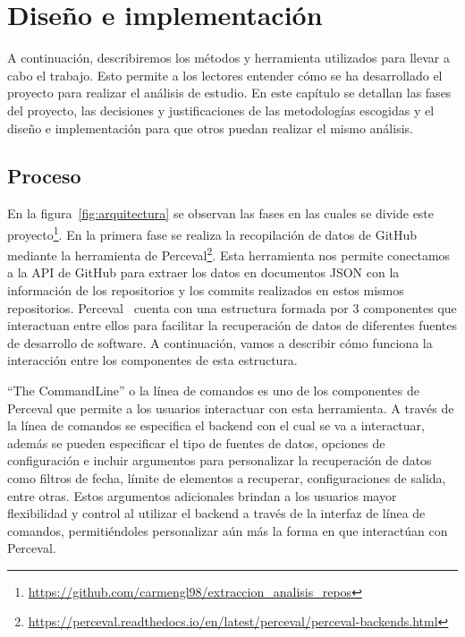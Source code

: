 \documentclass[a4paper, 12pt]{book}
\begin{document}

\cleardoublepage
\chapter{Diseño e implementación}
\label{chap:diseño}

A continuación, describiremos los métodos y herramienta utilizados para llevar a cabo el trabajo. 
Esto permite a los lectores entender cómo se ha desarrollado el proyecto para realizar el análisis de estudio.
En este capítulo se detallan las fases del proyecto, las decisiones y justificaciones de las metodologías escogidas y el diseño e implementación para que otros puedan realizar el mismo análisis.

\section{Proceso} 
\label{sec:proceso}

En la figura~\ref{fig:arquitectura} se observan las fases en las cuales se divide este proyecto\footnote{\url{https://github.com/carmengl98/extraccion_analisis_repos}}. 
En la primera fase se realiza la recopilación de datos de GitHub mediante la herramienta de Perceval\footnote{\url{https://perceval.readthedocs.io/en/latest/perceval/perceval-backends.html}}. 
Esta herramienta nos permite conectamos a la API de GitHub para extraer los datos en documentos JSON con la información de los repositorios y los commits realizados en estos mismos repositorios.
Perceval~\cite{duenas2018perceval} cuenta con una estructura formada por 3 componentes que interactuan entre ellos para facilitar la recuperación de datos de diferentes fuentes de desarrollo de software.
A continuación, vamos a describir cómo funciona la interacción entre los componentes de esta estructura.


``The CommandLine'' o la línea de comandos es uno de los componentes de Perceval que permite a los usuarios interactuar con esta herramienta.
A través de la línea de comandos se especifica el backend con el cual se va a interactuar, además se pueden especificar el tipo de fuentes de datos, opciones de configuración e incluir argumentos para personalizar la recuperación de datos como filtros de fecha, límite de elementos a recuperar, configuraciones de salida, entre otras.
Estos argumentos adicionales brindan a los usuarios mayor flexibilidad y control al utilizar el backend a través de la interfaz de línea de comandos, permitiéndoles personalizar aún más la forma en que interactúan con Perceval.
\end{document}
